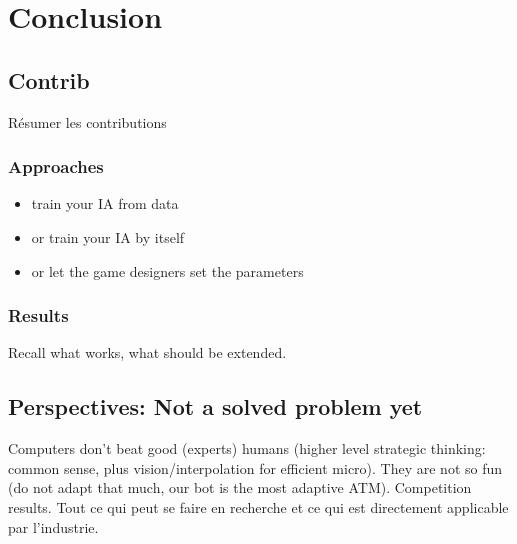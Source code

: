 \chapter{Conclusion}

\section{Contrib}
Résumer les contributions
\subsection{Approaches}
\begin{itemize}
\item train your IA from data
\item or train your IA by itself
\item or let the game designers set the parameters
\end{itemize}

\subsection{Results}
Recall what works, what should be extended.

\section{Perspectives: Not a solved problem yet}
Computers don't beat good (experts) humans (higher level strategic thinking: common sense, plus vision/interpolation for efficient micro). They are not so fun (do not adapt that much, our bot is the most adaptive ATM). Competition results.
Tout ce qui peut se faire en recherche et ce qui est directement applicable par l'industrie.


